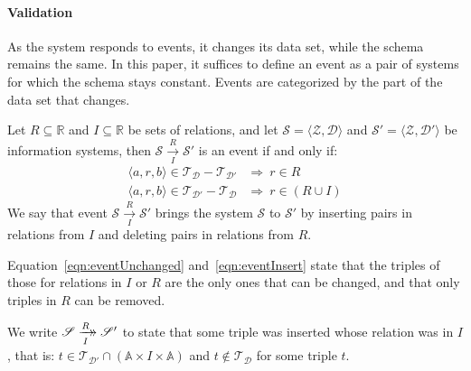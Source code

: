 \documentclass[runningheads]{llncs}
\newcommand{\xrightarrowdbl}[2][]{%
  \xrightarrow[#1]{#2}\mathrel{\mkern-14mu}\rightarrow
}
\newcommand{\pair}[2]{\langle{#1},{#2}\rangle}
\newcommand{\triple}[3]{\langle{#1},{#2},{#3}\rangle}
\newcommand{\Atoms}{\mathbb{A}}
\newcommand{\Rels}{\mathbb{R}}   %
\newcommand{\triples}{\mathcal{T}}
\newcommand{\Triple}[3]{#1\times#2\times#3}
\newcommand{\dataset}{\mathscr{D}}
\newcommand{\schema}{\mathscr{Z}}
\newcommand{\infsys}{\mathscr{S}}
\begin{document}
\paragraph{Validation}
   As the system responds to events, it changes its data set, while the schema remains the same.
   In this paper, it suffices to define an event as a pair of systems for which the schema stays constant.
   Events are categorized by the part of the data set that changes.

\begin{definition}[Event]
   Let $R \subseteq \Rels$ and $I \subseteq \Rels$ be sets of relations,
   and let $\infsys=\pair{\schema}{\dataset}$ and  $\infsys'=\pair{\schema}{\dataset'}$ be information systems,
   then $\infsys\xrightarrow[I]{R} \infsys'$ is an event if and only if:
\begin{align}
   \triple{a}{r}{b}\in\triples_{\dataset}-\triples_{\dataset'}&\Rightarrow\ r\in R\label{eqn:eventUnchanged}\\
   \triple{a}{r}{b}\in\triples_{\dataset'}-\triples_{\dataset}&\Rightarrow\ r\in(R \cup I)\label{eqn:eventInsert}
\end{align}
   We say that event $\infsys\xrightarrow[I]{R} \infsys'$ brings the system $\infsys$ to $\infsys'$ by inserting pairs in relations from $I$ and deleting pairs in relations from $R$.
\end{definition}

   Equation~\ref{eqn:eventUnchanged} and~\ref{eqn:eventInsert} state that the triples of those for relations in $I$ or $R$ are the only ones that can be changed, and that only triples in $R$ can be removed.

\begin{definition}
   We write $\infsys \xrightarrowdbl[I]{R} \infsys'$ to state that some triple was inserted whose relation was in $I$, that is:
   $t \in \triples_{\dataset'} \cap (\Triple{\Atoms}{I}{\Atoms})$ and $t \not\in \triples_{\dataset}$ for some triple $t$.
\end{definition}
\end{document}
